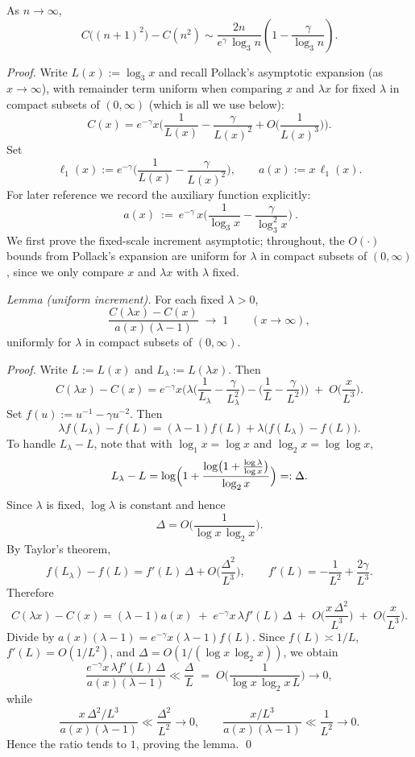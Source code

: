\begin{theorem}\label{thm:squares}
As $n\to\infty$,
\[
 C\big((n+1)^2\big) - C(n^2) \sim \frac{2n}{e^{\gamma}\,\log_3 n}\left(1-\frac{\gamma}{\log_3 n}\right).
\]
\end{theorem}

\begin{proof}
Write $L(x):=\log_3 x$ and recall Pollack's asymptotic expansion (as $x\to\infty$), with remainder term uniform when comparing $x$ and $\lambda x$ for fixed $\lambda$ in compact subsets of $(0,\infty)$ (which is all we use below):
\[
 C(x)=e^{-\gamma}x\Big(\frac{1}{L(x)}-\frac{\gamma}{L(x)^2}+O\Big(\frac{1}{L(x)^3}\Big)\Big).
\]
Set
\[
 \ell_1(x):=e^{-\gamma}\Big(\frac{1}{L(x)}-\frac{\gamma}{L(x)^2}\Big),\qquad a(x):=x\,\ell_1(x).
\]
For later reference we record the auxiliary function explicitly:
\begin{equation}\label{eq:aux-a}
 \boxed{\ a(x)\ :=\ e^{-\gamma}\,x\Big(\frac{1}{\log_3 x}-\frac{\gamma}{\log_3^2 x}\Big)\ }.
\end{equation}
We first prove the fixed-scale increment asymptotic; throughout, the $O(\cdot)$ bounds from Pollack's expansion are uniform for $\lambda$ in compact subsets of $(0,\infty)$, since we only compare $x$ and $\lambda x$ with $\lambda$ fixed.

\textit{Lemma (uniform increment).} For each fixed $\lambda>0$,
\[
 \frac{C(\lambda x)-C(x)}{a(x)(\lambda-1)}\;\longrightarrow\;1\qquad (x\to\infty),
\]
uniformly for $\lambda$ in compact subsets of $(0,\infty)$.

\textit{Proof.} Write $L:=L(x)$ and $L_\lambda:=L(\lambda x)$. Then
\[
 C(\lambda x)-C(x)
 =e^{-\gamma}x\Big(\lambda\Big(\frac{1}{L_\lambda}-\frac{\gamma}{L_\lambda^2}\Big)
 -\Big(\frac{1}{L}-\frac{\gamma}{L^2}\Big)\Big)\;+
 \;O\Big(\frac{x}{L^3}\Big).
\]
Set $f(u):=u^{-1}-\gamma u^{-2}$. Then
\[
 \lambda f(L_\lambda)-f(L)=(\lambda-1)f(L)+\lambda\bigl(f(L_\lambda)-f(L)\bigr).
\]
To handle $L_\lambda-L$, note that with $\log_1 x=\log x$ and $\log_2 x=\log\log x$,
\[
 L_\lambda-L
 =\log\Bigl(1+\frac{\log\bigl(1+\tfrac{\log\lambda}{\log x}\bigr)}{\log_2 x}\Bigr)
 =:\Delta.
\]
Since $\lambda$ is fixed, $\log\lambda$ is constant and hence
\[
 \Delta=O\!\Big(\frac{1}{\log x\,\log_2 x}\Big).
\]
By Taylor's theorem,
\[
 f(L_\lambda)-f(L)=f'(L)\,\Delta+O\Big(\frac{\Delta^2}{L^3}\Big),\qquad f'(L)=-\frac{1}{L^2}+\frac{2\gamma}{L^3}.
\]
Therefore
\[
 C(\lambda x)-C(x)=(\lambda-1)a(x)\;+
 \;e^{-\gamma}x\,\lambda f'(L)\,\Delta
 \;+
 \;O\Big(\frac{x\,\Delta^2}{L^3}\Big)
 \;+
 \;O\Big(\frac{x}{L^3}\Big).
\]
Divide by $a(x)(\lambda-1)=e^{-\gamma}x(\lambda-1)f(L)$. Since $f(L)\asymp 1/L$, $f'(L)=O(1/L^2)$, and $\Delta=O(1/(\log x\,\log_2 x))$, we obtain
\[
 \frac{e^{-\gamma}x\,\lambda f'(L)\,\Delta}{a(x)(\lambda-1)}
 \ll \frac{\Delta}{L}\;=\;O\!\Big(\frac{1}{\log x\,\log_2 x\,L}\Big)\to 0,
\]
while
\[
 \frac{x\,\Delta^2/L^3}{a(x)(\lambda-1)}\ll \frac{\Delta^2}{L^2}\to 0,\qquad
 \frac{x/L^3}{a(x)(\lambda-1)}\ll \frac{1}{L^2}\to 0.
\]
Hence the ratio tends to $1$, proving the lemma. \qed


\end{proof}
